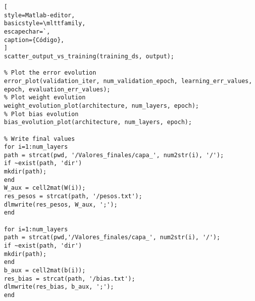 \documentclass{article}
\begin{document}
\begin{lstlisting}[
style=Matlab-editor,
basicstyle=\mlttfamily,
escapechar=`,
caption={Código},
]
scatter_output_vs_training(training_ds, output);

% Plot the error evolution
error_plot(validation_iter, num_validation_epoch, learning_err_values, epoch, evaluation_err_values);
% Plot weight evolution
weight_evolution_plot(architecture, num_layers, epoch);
% Plot bias evolution
bias_evolution_plot(architecture, num_layers, epoch);

% Write final values
for i=1:num_layers
path = strcat(pwd, '/Valores_finales/capa_', num2str(i), '/');
if ~exist(path, 'dir')
mkdir(path);
end
W_aux = cell2mat(W(i));
res_pesos = strcat(path, '/pesos.txt');
dlmwrite(res_pesos, W_aux, ';');
end

for i=1:num_layers
path = strcat(pwd,'/Valores_finales/capa_', num2str(i), '/');
if ~exist(path, 'dir')
mkdir(path);
end
b_aux = cell2mat(b(i));
res_bias = strcat(path, '/bias.txt');
dlmwrite(res_bias, b_aux, ';');
end



\end{lstlisting}
\end{document}
